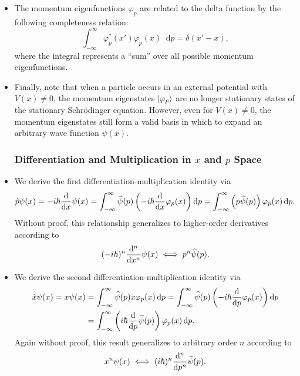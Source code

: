 \documentclass[11pt, a4paper]{article}
\newcommand{\diff}{\mathop{}\!\mathrm{d}} %
\newcommand{\Schro}{Schr\"{o}dinger\xspace}
\newcommand{\F}[1]{\widehat{#1}} %
\begin{document}
\begin{itemize}
    
    \item The momentum eigenfunctions $ \varphi_{p} $ are related to the delta function by the following completeness relation:
    \begin{equation*}
        \int_{-\infty}^{\infty} \varphi_{p}^{*}(x')\varphi_{p}(x)\diff p = \delta(x' - x),
    \end{equation*}
    where the integral represents a ``sum'' over all possible momentum eigenfunctions.
    
    \item Finally, note that when a particle occurs in an external potential with $ V(x) \neq 0 $, the momentum eigenstates $ \ket{\varphi_{p}} $ are no longer stationary states of the stationary \Schro equation. However, even for $ V(x) \neq 0 $, the momentum eigenstates still form a valid basis in which to expand an arbitrary wave function $ \psi(x) $.
    
\subsubsection{Differentiation and Multiplication in $ x $ and $ p $ Space}

    \item We derive the first differentiation-multiplication identity via
    \begin{equation*}
        \hat{p} \psi(x) = - i \hbar \dv{x} \psi(x) = \int_{-\infty}^{\infty}\F{\psi}(p) \left( -i \hbar \dv{x} \varphi_{p}(x) \right)\diff p = \int_{-\infty}^{\infty}\left( p \F{\psi}(p) \right) \varphi_{p}(x)\diff p.
    \end{equation*}
    Without proof, this relationship generalizes to higher-order derivatives according to
    \begin{equation*}
        (- i \hbar)^{n}\dv[n]{}{x} \psi(x) \iff p^{n} \F{\psi}(p).
    \end{equation*}
    
    \item We derive the second differentiation-multiplication identity via
    \begin{align*}
        \hat{x}\psi(x) = x \psi(x) &= \int_{-\infty}^{\infty}\F{\psi}(p)x \varphi_{p}(x)\diff p = \int_{-\infty}^{\infty}\F{\psi}(p) \left( -i \hbar \dv{p}\varphi_{p}(x) \right)\diff p\\
        & = \int_{-\infty}^{\infty}\left( i \hbar \dv{p}\F{\psi}(p) \right)\varphi_{p}(x)\diff p.
    \end{align*}
    Again without proof, this result generalizes to arbitrary order $ n $ according to
    \begin{equation*}
        x^{n}\psi(x) \iff (i \hbar)^{n} \dv[n]{}{p}\F{\psi}(p).
    \end{equation*}
    
\end{itemize}
\end{document}
